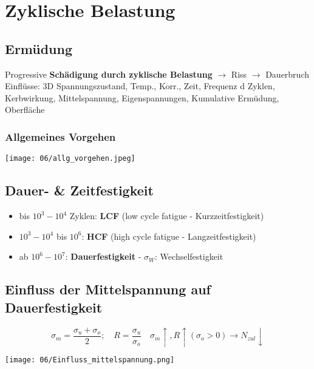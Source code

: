 \section{Zyklische Belastung}
    \subsection{Ermüdung}
        Progressive \textbf{Schädigung durch zyklische Belastung} $\rightarrow$ Riss $\rightarrow$ Dauerbruch\\
        Einflüsse: 3D Spannungszustand, Temp., Korr., Zeit, Frequenz d Zyklen, Kerbwirkung, Mittelspannung, Eigenspannungen, Kumulative Ermüdung, Oberfläche
        \subsubsection{Allgemeines Vorgehen}
            \texttt{[image: 06/allg\_vorgehen.jpeg]}
        \subsection{Dauer- \& Zeitfestigkeit}
            \begin{minipage}{\linewidth}
                \begin{itemize}
                    \item bis $10^3-10^4$ Zyklen: \textbf{LCF} (low cycle fatigue - Kurzzeitfestigkeit)
                    \item $10^3-10^4$ bis $10^6$: \textbf{HCF} (high cycle fatigue - Langzeitfestigkeit)
                    \item ab $10^6-10^7$: \textbf{Dauerfestigkeit} - $\sigma_W$: Wechselfestigkeit
                \end{itemize}
            \end{minipage}
    \subsection{Einfluss der Mittelspannung auf Dauerfestigkeit}
        \vspace{-3mm}
        \[\sigma_m=\frac{\sigma_u+\sigma_o}{2}; \quad R=\frac{\sigma_u}{\sigma_o} \quad \sigma_m \uparrow, R \uparrow (\sigma_o >0) \rightarrow N_{zul} \downarrow\]
        \begin{center}
            \vspace{-2mm}
            \texttt{[image: 06/Einfluss\_mittelspannung.png]}
        \end{center}
